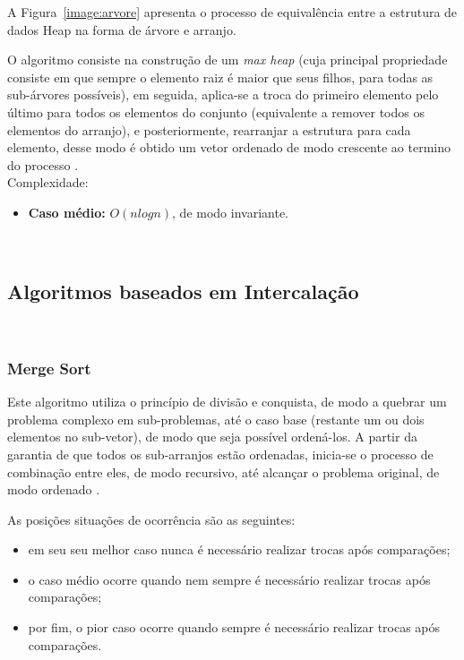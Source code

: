 \documentclass[conference,onecolumn]{IEEEtran}
\begin{document}
A Figura~\ref{image:arvore} apresenta o processo de equivalência entre a estrutura de dados Heap na forma de árvore e arranjo.

O algoritmo consiste na construção de um \textit{max heap} (cuja principal propriedade consiste em que sempre o elemento raiz é maior que seus filhos, para todas as sub-árvores possíveis), em seguida, aplica-se a troca do primeiro elemento pelo último para todos os elementos do conjunto (equivalente a remover todos os elementos do arranjo), e posteriormente, rearranjar a estrutura para cada elemento, desse modo é obtido um vetor ordenado de modo crescente ao termino do processo \cite{ziviani}.\\

Complexidade:
\begin{itemize}
\item \textbf{Caso médio:} $O (nlog n)$, de modo invariante.
\end{itemize}

~\\
\subsection{Algoritmos baseados em Intercalação}

~\\
\subsubsection{Merge Sort}

Este algoritmo utiliza o princípio de divisão e conquista, de modo a quebrar um problema complexo em sub-problemas, até o caso base (restante um ou dois elementos no sub-vetor), de modo que seja possível ordená-los. A partir da garantia de que todos os sub-arranjos estão ordenadas, inicia-se o processo de combinação entre eles, de modo recursivo, até alcançar o problema original, de modo ordenado \cite{sedgewick}.

As posições situações de ocorrência são as seguintes:
\begin{itemize}
\item em seu seu melhor caso nunca é necessário realizar trocas após comparações;
\item o caso médio ocorre quando nem sempre é necessário realizar trocas após comparações;
\item por fim, o pior caso ocorre quando sempre é necessário realizar trocas após comparações.
\end{itemize}~\\
\end{document}
